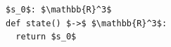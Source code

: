\documentclass[border=10pt]{standalone}
\begin{document}
\begin{lstlisting}
$s_0$: $\mathbb{R}^3$
def state() $->$ $\mathbb{R}^3$:
  return $s_0$
\end{lstlisting}
\end{document}
